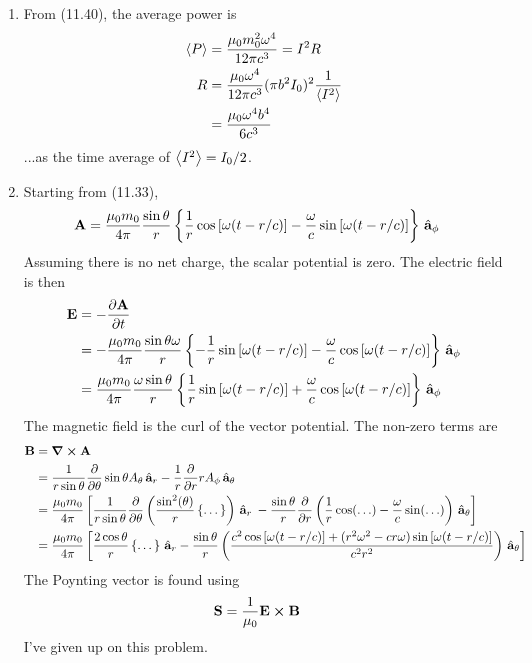 \documentclass{homework}
\begin{document}
\begin{enumerate}
		
		\item From (11.40), the average power is \begin{align*}
			\expval{P} & = \frac{\mu_0 m_0^2 \omega^4}{12 \pi c^3} = I^2 R \\
			R & = \frac{\mu_0 \omega^4}{12 \pi c^3} (\pi b^2 I_0)^2 \frac{1}{\expval{I^2}} \\
				& = \frac{\mu_0 \omega^4 b^4}{6 c^3}
		\end{align*}
		...as the time average of $\expval{I^2} = I_0 / 2$.
		\item Starting from (11.33), \begin{align*}
			\boldsymbol{\mathrm{A}} & = \frac{\mu_0 m_0}{4 \pi} \frac{\sin \theta}{r} \left\{
				\frac{1}{r} \cos\left[\omega(t - r/c)\right]
				- \frac{\omega}{c} \sin\left[\omega(t - r/c)\right]
			\right\} \thinspace\hat{ \mathbf{a}}_{\phi}
		\end{align*}
		Assuming there is no net charge, the scalar potential is zero. The electric field is then \begin{align*}
			\boldsymbol{\mathrm{E}} & = -\pdv{ \boldsymbol{\mathrm{A}} }{t} \\
				& = -\frac{\mu_0 m_0 }{4 \pi} \frac{\sin\theta \omega}{r} \left\{
					-\frac{1}{r} \sin\left[\omega(t - r/c) \right]
					- \frac{\omega}{c} \cos\left[\omega(t - r/c) \right]
				\right\} \thinspace\hat{ \mathbf{a}}_{\phi} \\
				& = \frac{\mu_0 m_0 }{4 \pi} \frac{\omega \sin\theta}{r} \left\{
				\frac{1}{r} \sin\left[\omega(t - r/c) \right]
				+ \frac{\omega}{c} \cos\left[\omega(t - r/c) \right]
				\right\} \thinspace\hat{ \mathbf{a}}_{\phi} \\
		\end{align*}
		The magnetic field is the curl of the vector potential. The non-zero terms are \begin{align*}
			\boldsymbol{\mathrm{B}} & = \curl\boldsymbol{\mathrm{A}} \\
				& = \frac{1}{r \sin \theta} \pdv{\theta} \sin \theta A_\theta \thinspace\hat{ \mathbf{a}}_{r}
					- \frac{1}{r}
						\pdv{r} r A_\phi
					\thinspace\hat{ \mathbf{a}}_{\theta} \\
				& = \frac{\mu_0 m_0}{4 \pi} \left[
					\frac{1}{r \sin \theta} \pdv{\theta} \left(
						\frac{ \sin[2](\theta) }{r} \left\{\dots\right\} 
					\right) \thinspace\hat{ \mathbf{a}}_{r} \:
					- \frac{\sin \theta}{r} \pdv{r}
						\left(
							\frac{1}{r} \cos(\dots)
							- \frac{\omega}{c} \sin(\dots)
						\right) \thinspace\hat{ \mathbf{a}}_{\theta}
				\right] \\
				& = \frac{\mu_0 m_0}{4 \pi} \left[
					\frac{2 \cos \theta}{r} \left\{ \dots \right\} \thinspace\hat{ \mathbf{a}}_{r}
					- \frac{\sin \theta}{r} \left(
						\frac{
							c^2 \cos\left[\omega(t - r/c) \right]
							+ (r^2 \omega^2 - cr \omega) \sin\left[\omega(t - r/c) \right]
					 }{c^2 r^2}
					\right)\thinspace\hat{ \mathbf{a}}_{\theta}
				\right]
		\end{align*}
		The Poynting vector is found using \begin{align*}
			\boldsymbol{\mathrm{S}} & = \frac{1}{\mu_0} \boldsymbol{\mathrm{E}} \cross \boldsymbol{\mathrm{B}}
		\end{align*}
		I've given up on this problem.
		

\end{enumerate}
\end{document}
